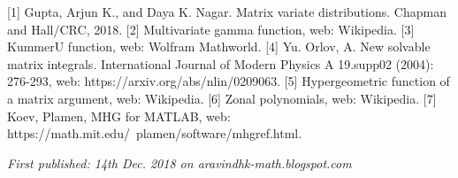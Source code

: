 [1] Gupta, Arjun K., and Daya K. Nagar. Matrix variate distributions. Chapman and Hall/CRC, 2018.
[2] Multivariate gamma function, web: Wikipedia.
[3] KummerU function, web: Wolfram Mathworld.
[4] Yu. Orlov, A. New solvable matrix integrals. International Journal of Modern Physics A 19.supp02 (2004): 276-293, web: https://arxiv.org/abs/nlin/0209063.
[5] Hypergeometric function of a matrix argument, web: Wikipedia.
[6] Zonal polynomials, web: Wikipedia.
[7] Koev, Plamen, MHG for MATLAB, web: https://math.mit.edu/~plamen/software/mhgref.html.

\emph{First published: 14th Dec. 2018 on aravindhk-math.blogspot.com}
